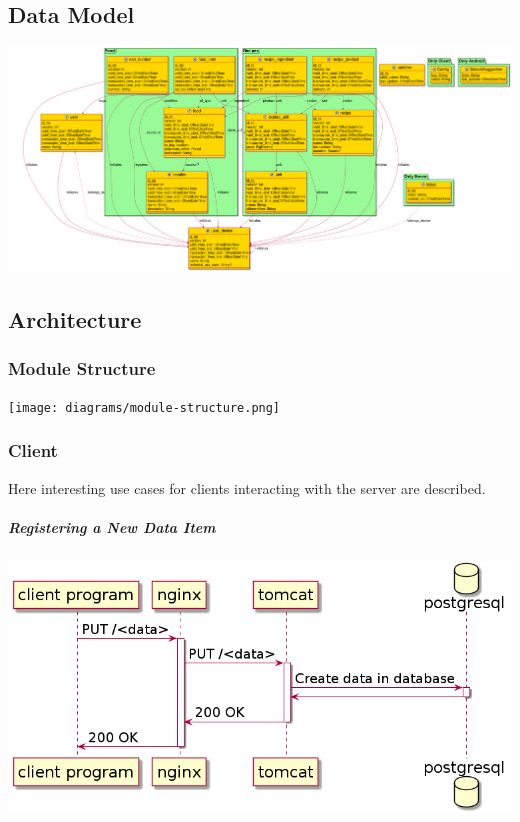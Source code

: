 \documentclass{memoir}
\begin{document}
\chapter{}
\section{Data Model}

\includegraphics[width=1.25\linewidth]{diagrams/data-model.png}

\section{Architecture}

\subsection{Module Structure}

\texttt{[image: diagrams/module-structure.png]}

\subsection{Client}

Here interesting use cases for clients interacting with the server are described.

\paragraph{Registering a New Data Item\\}

\includegraphics[width=\linewidth]{diagrams/put-data.png}
\end{document}
